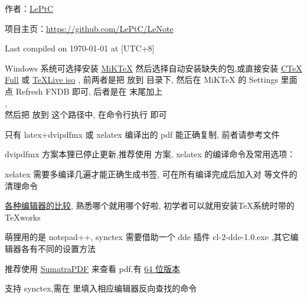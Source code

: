 \documentclass{leptc}
\begin{document}

作者：\href{mailto:alileptc@gmail.com}{LePtC}

项目主页：\url{https://github.com/LePtC/LeNote }

Last compiled on {\yyyymmdddate\today} at {\hhmmsstime} [UTC+8]



Windows 系统可选择安装
\href{http://miktex.org/download}{MiKTeX}
然后选择自动安装缺失的包,或直接安装
\href{http://www.ctex.org/CTeXDownload }{CTeX Full}
或 \href{http://www.ctan.org/tex-archive/systems/texlive/Images/ }{TeXLive iso} ,
前两者是把  放到
 目录下,
然后在 MiKTeX 的 Settings 里面点 Refresh FNDB 即可,
后者是在  末尾加上
\\ ,
\\然后把 放到
 这个路径中,
在命令行执行  即可

只有 latex+dvipdfmx 或 xelatex 编译出的 pdf 能正确复制,
前者请参考文件 

dvipdfmx 方案本狸已停止更新,推荐使用 \XeTeX 方案,
xelatex 的编译命令及常用选项：


xelatex 需要多编译几遍才能正确生成书签,
可在所有编译完成后加入对
等文件的清理命令


\href{http://tex.stackexchange.com/questions/339/latex-editors-ides }{各种编辑器的比较},
熟悉哪个就用哪个好啦,
初学者可以就用安装\TeX 系统时带的 TeXworks

萌狸用的是 notepad++, synctex 需要借助一个 dde 插件
cl-2-dde-1.0.exe ,其它编辑器各有不同的设置方法

 推荐使用
\href{http://blog.kowalczyk.info/software/sumatrapdf/download-free-pdf-viewer-cn.html }{SumatraPDF}
来查看 pdf,有
\href{http://xhmikosr.1f0.de/sumatrapdf/ }{64 位版本}

支持 synctex,需在  里填入相应编辑器反向查找的命令
\end{document}

